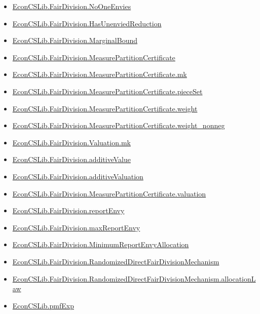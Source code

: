 \documentclass[10pt]{article}
\begin{document}
\begin{itemize}[leftmargin=1.2em]
\begin{itemize}[leftmargin=1.2em]
\item \hyperlink{library-prerequisite-08cc9632a38d6283}{EconCSLib.FairDivision.NoOneEnvies}
\item \hyperlink{library-prerequisite-f341330f111ba23a}{EconCSLib.FairDivision.HasUnenviedReduction}
\item \hyperlink{library-prerequisite-dabaec515415d42f}{EconCSLib.FairDivision.MarginalBound}
\item \hyperlink{library-prerequisite-9a5f21d635f4a63f}{EconCSLib.FairDivision.MeasurePartitionCertificate}
\item \hyperlink{library-prerequisite-984b49776f6614ad}{EconCSLib.FairDivision.MeasurePartitionCertificate.mk}
\item \hyperlink{library-prerequisite-6d9046b2ccfbea71}{EconCSLib.FairDivision.MeasurePartitionCertificate.pieceSet}
\item \hyperlink{library-prerequisite-5a7ac9f2250c3609}{EconCSLib.FairDivision.MeasurePartitionCertificate.weight}
\item \hyperlink{library-prerequisite-31ddab051aae02c8}{EconCSLib.FairDivision.MeasurePartitionCertificate.weight\_nonneg}
\item \hyperlink{library-prerequisite-8e3ff021fbc107c6}{EconCSLib.FairDivision.Valuation.mk}
\item \hyperlink{library-prerequisite-1b4574cf4a668d8c}{EconCSLib.FairDivision.additiveValue}
\item \hyperlink{library-prerequisite-2cfa18e0d034e622}{EconCSLib.FairDivision.additiveValuation}
\item \hyperlink{library-prerequisite-4c99909416a40645}{EconCSLib.FairDivision.MeasurePartitionCertificate.valuation}
\item \hyperlink{library-prerequisite-706f19e8e9a38d10}{EconCSLib.FairDivision.reportEnvy}
\item \hyperlink{library-prerequisite-529f7ebc1ceacafe}{EconCSLib.FairDivision.maxReportEnvy}
\item \hyperlink{library-prerequisite-7d4b8da279bc77dd}{EconCSLib.FairDivision.MinimumReportEnvyAllocation}
\item \hyperlink{library-prerequisite-ed698d7d017becff}{EconCSLib.FairDivision.RandomizedDirectFairDivisionMechanism}
\item \hyperlink{library-prerequisite-f27ab286660c4a50}{EconCSLib.FairDivision.RandomizedDirectFairDivisionMechanism.allocationLaw}
\item \hyperlink{library-prerequisite-e5c7eedc40c11b7a}{EconCSLib.pmfExp}

\end{itemize}
\end{itemize}
\end{document}
